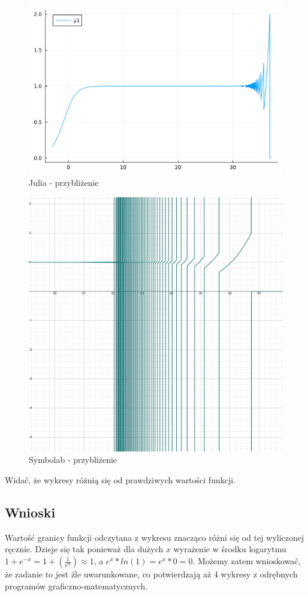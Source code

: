 \documentclass[10pt,a4paper, polish]{article}
\begin{document}
\begin{figure}[H]
\caption{Julia - przybliżenie}
\centering
\includegraphics[scale=0.3]{plots/ex2/julia-closeup.png}
\end{figure}
\begin{figure}[H]
\caption{Symbolab - przybliżenie}
\centering
\includegraphics[scale=0.11]{plots/ex2/symbolab-closeup.png}
\end{figure}
Widać, że wykresy różnią się od prawdziwych wartości funkcji.
\subsection*{Wnioski}
Wartość granicy funkcji odczytana z wykresu znacząco różni się od tej wyliczonej ręcznie. Dzieje się tak ponieważ dla dużych $x$ wyrażenie w środku logarytmu $1+e^{-x} = 1+( \frac{1}{e^x})  \approx 1$, a $e^x*ln(1) = e^x*0=0$. Możemy zatem wnioskować, że zadanie to jest źle uwarunkowane, co potwierdzają aż 4 wykresy z odrębnych programów graficzno-matematycznych.
\end{document}
